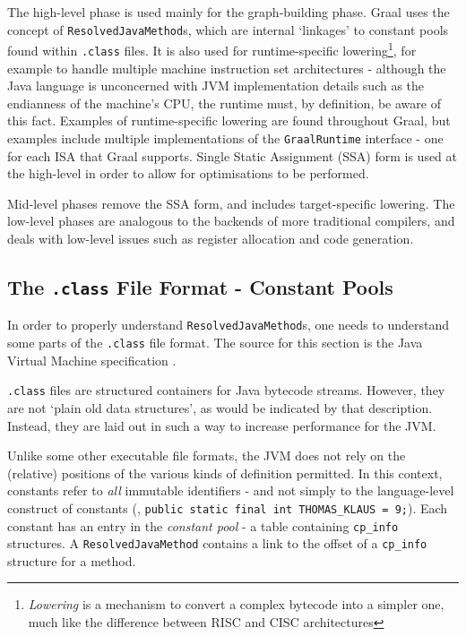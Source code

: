 The high-level phase is used mainly for the graph-building phase. Graal uses the concept of \texttt{ResolvedJavaMethod}s, which are internal `linkages' to constant pools found within \texttt{.class} files. It is also used for runtime-specific lowering\footnote{\emph{Lowering} is a mechanism to convert a complex bytecode into a simpler one, much like the difference between RISC and CISC architectures}, for example to handle multiple machine instruction set architectures - although the Java language is unconcerned with JVM implementation details such as the endianness of the machine's CPU, the runtime must, by definition, be aware of this fact. Examples of runtime-specific lowering are found throughout Graal, but examples include multiple implementations of the \texttt{GraalRuntime} interface - one for each ISA that Graal supports. Single Static Assignment (SSA) form is used at the high-level in order to allow for optimisations to be performed.

Mid-level phases remove the SSA form, and includes target-specific lowering. The low-level phases are analogous to the backends of more traditional compilers, and deals with low-level issues such as register allocation and code generation.

	\subsection{The \texttt{.class} File Format - Constant Pools}
	In order to properly understand \texttt{ResolvedJavaMethod}s, one needs to understand some parts of the \texttt{.class} file format. The source for this section is the Java Virtual Machine specification \citep[p.~69]{JVMSpec}.
		
	\texttt{.class} files are structured containers for Java bytecode streams. However, they are not `plain old data structures', as would be indicated by that description. Instead, they are laid out in such a way to increase performance for the JVM.
				
	Unlike some other executable file formats, the JVM does not rely on the (relative) positions of the various kinds of definition permitted. In this context, constants refer to \emph{all} immutable identifiers - and not simply to the language-level construct of constants (\eg, \texttt{public static final int THOMAS\_KLAUS = 9;}). Each constant has an entry in the \emph{constant pool} - a table containing \texttt{cp\_info} structures. A \texttt{ResolvedJavaMethod} contains a link to the offset of a \texttt{cp\_info} structure for a method.